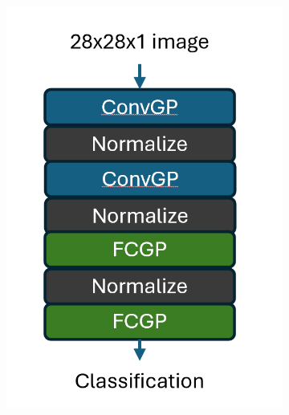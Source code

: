 \documentclass{article}
\begin{document}
\begin{figure}[h]
    \centering
    \begin{subfigure}[b]{0.3\columnwidth}
        \includegraphics[width=\textwidth]{MNIST_model.png}
        \caption{}
    \end{subfigure}
    \begin{subfigure}[b]{0.3\columnwidth}

\end{subfigure}
\end{figure}
\end{document}
